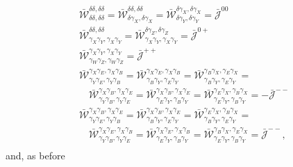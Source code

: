 \documentclass[a4paper,11pt]{article}
\begin{document}
      \begin{align}
        &\bar{\mathcal{W}}^{\delta  \delta  ,\delta  \delta  }_{\delta  \delta  ,\delta  \delta  }=
         \bar{\mathcal{W}}^{\delta  \delta  ,\delta  \delta  }_{\delta  \gamma_X,\delta  \gamma_X}=
         \bar{\mathcal{W}}^{\delta  \gamma_X,\delta  \gamma_X}_{\delta  \gamma_Y,\delta  \gamma_Y}=\bar{\mathcal{J}}^{00}\\
        &\bar{\mathcal{W}}^{\delta  \delta  ,\delta  \delta  }_{\gamma_X\gamma_Y,\gamma_X\gamma_Y}=
         \bar{\mathcal{W}}^{\delta  \gamma_Z,\delta  \gamma_Z}_{\gamma_X\gamma_Y,\gamma_X\gamma_Y}=\bar{\mathcal{J}}^{0+}\\
        &\bar{\mathcal{W}}^{\gamma_X\gamma_Y,\gamma_X\gamma_Y}_{\gamma_W\gamma_Z,\gamma_W\gamma_Z}=\bar{\mathcal{J}}^{++}\\
        &\bar{\mathcal{W}}^{\gamma_X\gamma_E,\gamma_X\gamma_B}_{\gamma_Y\gamma_E,\gamma_Y\gamma_B}=
         \bar{\mathcal{W}}^{\gamma_X\gamma_E,\gamma_X\gamma_B}_{\gamma_B\gamma_Y,\gamma_E\gamma_Y}=
         \bar{\mathcal{W}}^{\gamma_B\gamma_X,\gamma_E\gamma_X}_{\gamma_B\gamma_Y,\gamma_E\gamma_Y}=\\
        &\hspace{12pt}
         \bar{\mathcal{W}}^{\gamma_X\gamma_B,\gamma_X\gamma_E}_{\gamma_Y\gamma_B,\gamma_Y\gamma_E}=
         \bar{\mathcal{W}}^{\gamma_X\gamma_B,\gamma_X\gamma_E}_{\gamma_E\gamma_Y,\gamma_B\gamma_Y}=
         \bar{\mathcal{W}}^{\gamma_E\gamma_X,\gamma_B\gamma_X}_{\gamma_E\gamma_Y,\gamma_B\gamma_Y}=-\bar{\mathcal{J}}^{--}\\
        &\bar{\mathcal{W}}^{\gamma_X\gamma_B,\gamma_X\gamma_E}_{\gamma_Y\gamma_E,\gamma_Y\gamma_B}=
         \bar{\mathcal{W}}^{\gamma_X\gamma_B,\gamma_X\gamma_E}_{\gamma_B\gamma_Y,\gamma_E\gamma_Y}=
         \bar{\mathcal{W}}^{\gamma_E\gamma_X,\gamma_B\gamma_X}_{\gamma_B\gamma_Y,\gamma_E\gamma_Y}=\\
        &\hspace{12pt}
         \bar{\mathcal{W}}^{\gamma_X\gamma_E,\gamma_X\gamma_B}_{\gamma_Y\gamma_B,\gamma_Y\gamma_E}=
         \bar{\mathcal{W}}^{\gamma_X\gamma_E,\gamma_X\gamma_B}_{\gamma_E\gamma_Y,\gamma_B\gamma_Y}=
         \bar{\mathcal{W}}^{\gamma_B\gamma_X,\gamma_E\gamma_X}_{\gamma_E\gamma_Y,\gamma_B\gamma_Y}=\bar{\mathcal{J}}^{--},\\
      \end{align}
      and, as before
\end{document}
